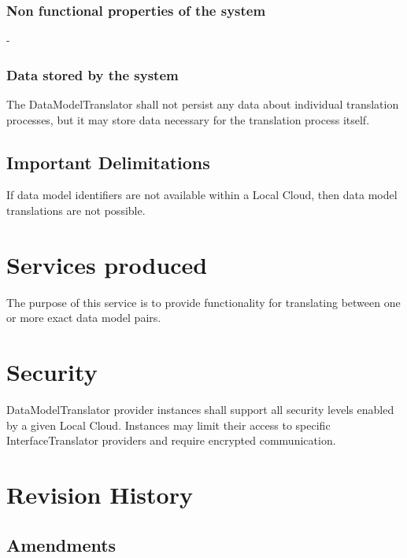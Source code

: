 \documentclass[a4paper]{arrowhead}
\begin{document}
\subsubsection {Non functional properties of the system}
-

\subsubsection {Data stored by the system}

The DataModelTranslator shall not persist any data about individual translation processes, but it may store data necessary for the translation process itself.

\subsection{Important Delimitations}
\label{sec:delimitations}

If data model identifiers are not available within a Local Cloud, then data model translations are not possible.

\section{Services produced}
\label{sec:services}

{}

The purpose of this service is to provide functionality for translating between
one or more exact data model pairs.

\section{Security}
\label{sec:security}

DataModelTranslator provider instances shall support all security levels enabled by a given Local Cloud.
Instances may limit their access to specific InterfaceTranslator providers and require encrypted communication.

\newpage




\newpage

\section{Revision History}
\subsection{Amendments}
\end{document}
